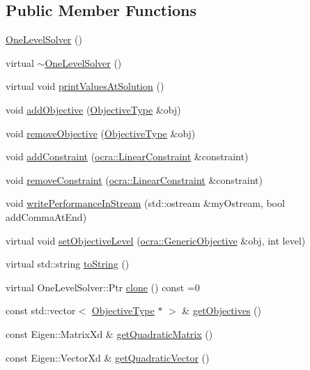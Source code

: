 \subsection*{Public Member Functions}
\begin{DoxyCompactItemize}
\item 
\hyperlink{classocra_1_1OneLevelSolver_a588397d9d887af06a5b88dcdb00d7f49}{One\+Level\+Solver} ()
\item 
virtual \hyperlink{classocra_1_1OneLevelSolver_a12fba5d2e72bdbeab5168b567c164687}{$\sim$\+One\+Level\+Solver} ()
\item 
virtual void \hyperlink{classocra_1_1OneLevelSolver_a90751a818854e6b91342f209fd5a0fd2}{print\+Values\+At\+Solution} ()
\item 
void \hyperlink{classocra_1_1OneLevelSolver_ad43ed5d37424a70fc9c5ef9e7cb3b0fa}{add\+Objective} (\hyperlink{classocra_1_1OneLevelSolver_a93b0be052a859bbd4c81584aa1646ffb}{Objective\+Type} \&obj)
\item 
void \hyperlink{classocra_1_1OneLevelSolver_a667f69c3c70fd99622d2417f91466299}{remove\+Objective} (\hyperlink{classocra_1_1OneLevelSolver_a93b0be052a859bbd4c81584aa1646ffb}{Objective\+Type} \&obj)
\item 
void \hyperlink{classocra_1_1OneLevelSolver_a6f4ea581d38ef75032d15b954280e790}{add\+Constraint} (\hyperlink{namespaceocra_ae8b87cf4099be3efc3b410019ad2046e}{ocra\+::\+Linear\+Constraint} \&constraint)
\item 
void \hyperlink{classocra_1_1OneLevelSolver_ae111869c3f0d4b405bfcb325a2fb7283}{remove\+Constraint} (\hyperlink{namespaceocra_ae8b87cf4099be3efc3b410019ad2046e}{ocra\+::\+Linear\+Constraint} \&constraint)
\item 
void \hyperlink{classocra_1_1OneLevelSolver_a76c08041cc49d865ce2d68e6e8ae6a41}{write\+Performance\+In\+Stream} (std\+::ostream \&my\+Ostream, bool add\+Comma\+At\+End)
\item 
virtual void \hyperlink{classocra_1_1OneLevelSolver_ad29abe16f72ae1e1d6ba9017d849ed3f}{set\+Objective\+Level} (\hyperlink{namespaceocra_a37a91885f4fa5c523d22cb15d5673062}{ocra\+::\+Generic\+Objective} \&obj, int level)
\item 
virtual std\+::string \hyperlink{classocra_1_1OneLevelSolver_a4d96beb846ca420bd1efcc96229f9d52}{to\+String} ()
\item 
virtual One\+Level\+Solver\+::\+Ptr \hyperlink{classocra_1_1OneLevelSolver_a08ecd92d4295e03aa03075a71d481f48}{clone} () const =0
\item 
const std\+::vector$<$ \hyperlink{classocra_1_1OneLevelSolver_a93b0be052a859bbd4c81584aa1646ffb}{Objective\+Type} $\ast$ $>$ \& \hyperlink{classocra_1_1OneLevelSolver_aa3f845cd1331b379caea0f5b6e621a59}{get\+Objectives} ()
\item 
const Eigen\+::\+Matrix\+Xd \& \hyperlink{classocra_1_1OneLevelSolver_a36a51b6eb94fecd84bd0e30f3141ad57}{get\+Quadratic\+Matrix} ()
\item 
const Eigen\+::\+Vector\+Xd \& \hyperlink{classocra_1_1OneLevelSolver_a90ab0f4140d37e519adfb37d74864061}{get\+Quadratic\+Vector} ()
\end{DoxyCompactItemize}
